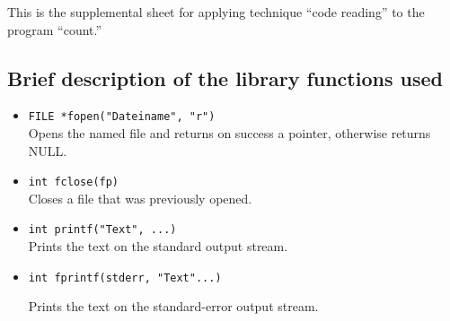 
This is the supplemental sheet 
for applying technique ``code reading''
to the program ``count.''

\subsection*{Brief description of the library functions used}

\begin{itemize}

\item {\tt FILE *fopen("Dateiname", "r")}\\
Opens the named file and returns on success a pointer, 
otherwise returns NULL.

\item {\tt int fclose(fp)}\\
Closes a file that was previously opened.

\item {\tt int printf("Text", ...)}\\
Prints the text on the standard output stream.

\item {\tt int fprintf(stderr, "Text"...)}

Prints the text on the standard-error output stream.

\end{itemize}
